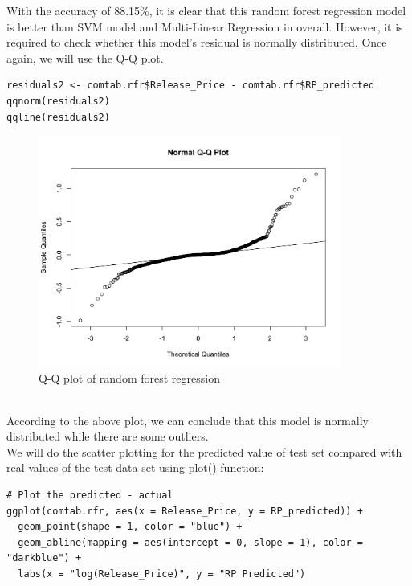 \documentclass[a4paper]{article}
\theoremstyle{definition}
\begin{document}
With the accuracy of 88.15\%, it is clear that this random forest regression model is better than SVM model and Multi-Linear Regression in overall. However, it is required to check whether this model's residual is normally distributed. Once again, we will use the Q-Q plot.
\begin{mdframed}[leftline=false,rightline=false,backgroundcolor=lightblue!10,nobreak=false,numbers=false]
    \begin{verbatim}
residuals2 <- comtab.rfr$Release_Price - comtab.rfr$RP_predicted
qqnorm(residuals2)
qqline(residuals2)
\end{verbatim}
\end{mdframed}
\begin{figure}[h!]
\begin{center}
\includegraphics[width=10cm]{images/qqplot_rfr.png}
\end{center}
\caption{Q-Q plot of random forest regression}
\end{figure}
\\
According to the above plot, we can conclude that this model is normally distributed while there are some outliers.\\
We will do the scatter plotting for the predicted value of test set compared with real values of
the test data set using plot() function:\\
\begin{mdframed}[leftline=false,rightline=false,backgroundcolor=lightblue!10,nobreak=false,numbers=false]
    \begin{verbatim}
# Plot the predicted - actual
ggplot(comtab.rfr, aes(x = Release_Price, y = RP_predicted)) +
  geom_point(shape = 1, color = "blue") +
  geom_abline(mapping = aes(intercept = 0, slope = 1), color = "darkblue") +
  labs(x = "log(Release_Price)", y = "RP Predicted")
\end{verbatim}
\end{mdframed}
\end{document}
